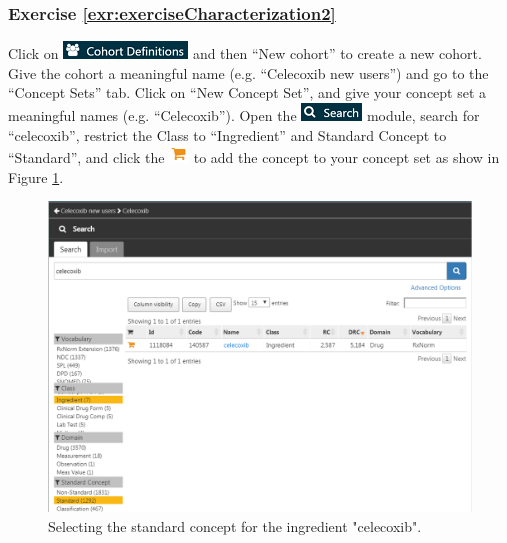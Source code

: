 \documentclass[11pt]{book}
\theoremstyle{definition}
\theoremstyle{definition}
\theoremstyle{definition}
\theoremstyle{remark}
\begin{document}
\subsubsection*{Exercise
\ref{exr:exerciseCharacterization2}}\label{exercise-refexrexercisecharacterization2}

Click on \includegraphics{images/Cohorts/cohortdefinition.png} and then
``New cohort'' to create a new cohort. Give the cohort a meaningful name
(e.g. ``Celecoxib new users'') and go to the ``Concept Sets'' tab. Click
on ``New Concept Set'', and give your concept set a meaningful names
(e.g. ``Celecoxib''). Open the
\includegraphics{images/Cohorts/search-2.png} module, search for
``celecoxib'', restrict the Class to ``Ingredient'' and Standard Concept
to ``Standard'', and click the
\includegraphics{images/Cohorts/shoppingcart.png} to add the concept to
your concept set as show in Figure \ref{fig:conceptSearchAtlas}.

\begin{figure}

{\centering \includegraphics[width=1\linewidth]{images/SuggestedAnswers/conceptSearchAtlas} 

}

\caption{Selecting the standard concept for the ingredient "celecoxib".}\label{fig:conceptSearchAtlas}
\end{figure}
\end{document}
